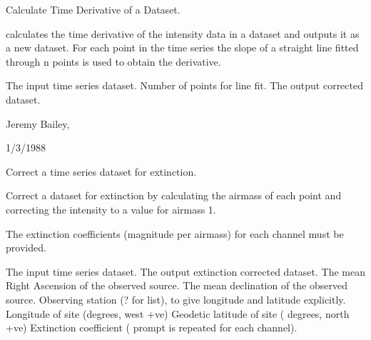\begin{manroutinedescription}
        Calculate Time Derivative of a Dataset.

        {} calculates the time derivative of the intensity
        data in a dataset and outputs it as a new dataset.
        For each point in the time series the slope of a straight
        line fitted through n points is used to obtain the derivative.

\begin{manparametertable}
  The input %
time series dataset.
  Number of points for line %
fit.
  The %
output corrected dataset.

\end{manparametertable}
        Jeremy Bailey, {}

        1/3/1988

\end{manroutinedescription}
\begin{manroutinedescription}
        Correct a time series dataset for extinction.

        Correct a dataset for extinction by calculating the airmass
        of each point and correcting the intensity to a value for
        airmass 1.

        The extinction coefficients (magnitude per airmass) for each
        channel must be provided.

\begin{manparametertable}
  The input %
time series dataset.
  The %
output extinction corrected dataset.
     The {} mean Right %
Ascension of the
                               observed source.
     The {} mean %
declination of the observed
                               source.
     Observing station (? for list), %
{} to give
                               longitude and latitude explicitly.
   Longitude of site (degrees, %
west +ve)
   Geodetic latitude of site (%
degrees, north +ve)
     Extinction coefficient (%
prompt is repeated
                              for each channel).

\end{manparametertable}
\end{manroutinedescription}

